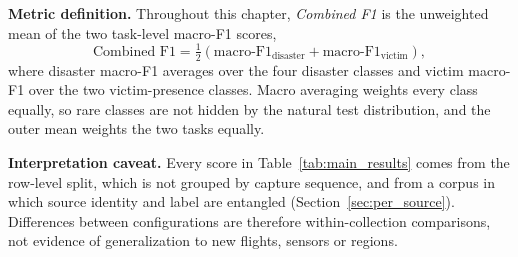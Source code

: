 \textbf{Metric definition.} Throughout this chapter, \emph{Combined F1} is the unweighted mean of the two task-level macro-F1 scores,
\begin{equation}
    \text{Combined F1} = \tfrac{1}{2}\left(\text{macro-F1}_{\text{disaster}} + \text{macro-F1}_{\text{victim}}\right),
\end{equation}
where disaster macro-F1 averages over the four disaster classes and victim macro-F1 over the two victim-presence classes. Macro averaging weights every class equally, so rare classes are not hidden by the natural test distribution, and the outer mean weights the two tasks equally.

\textbf{Interpretation caveat.} Every score in Table~\ref{tab:main_results} comes from the row-level split, which is not grouped by capture sequence, and from a corpus in which source identity and label are entangled (Section~\ref{sec:per_source}). Differences between configurations are therefore within-collection comparisons, not evidence of generalization to new flights, sensors or regions.

